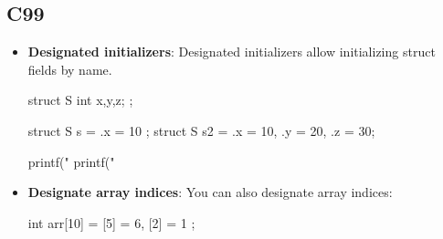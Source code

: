 \documentclass{report}
\begin{document}
        \subsection{C99}
        \begin{itemize}
            \item \textbf{Designated initializers}: Designated initializers allow initializing struct fields by name.
                \bigbreak \noindent 
                \begin{cppcode}
                    struct S {
                        int x,y,z;
                    };

                    struct S s  = {.x = 10 };
                    struct S s2  = {.x = 10, .y = 20, .z = 30};

                    printf("%
                    printf("%
                \end{cppcode}
            \item \textbf{Designate array indices}: You can also designate array indices:
                \bigbreak \noindent 
                \begin{cppcode}
                    int arr[10] = {
                        [5] = 6,
                        [2] = 1
                    };


\end{cppcode}
\end{itemize}
\end{document}
